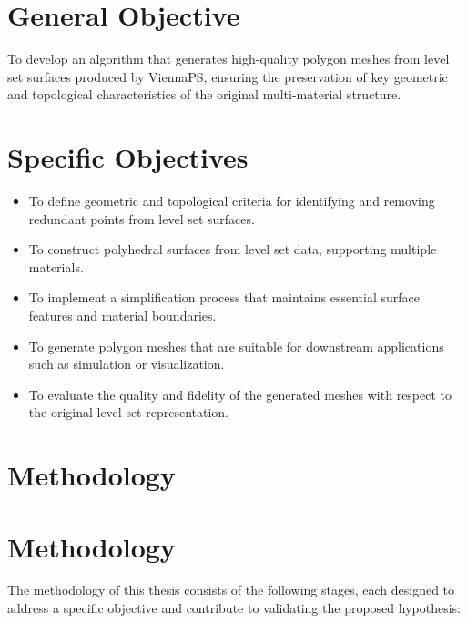 \documentclass[submission]{eptcs}
\begin{document}
\section{General Objective}

To develop an algorithm that generates high-quality polygon meshes from level set surfaces produced by ViennaPS, ensuring the preservation of key geometric and topological characteristics of the original multi-material structure.



\section{Specific Objectives}

\begin{itemize}
    \item To define geometric and topological criteria for identifying and removing redundant points from level set surfaces.
    \item To construct polyhedral surfaces from level set data, supporting multiple materials.
    \item To implement a simplification process that maintains essential surface features and material boundaries.
    \item To generate polygon meshes that are suitable for downstream applications such as simulation or visualization.
    \item To evaluate the quality and fidelity of the generated meshes with respect to the original level set representation.
\end{itemize}

\section{Methodology}

\section{Methodology}

The methodology of this thesis consists of the following stages, each designed to address a specific objective and contribute to validating the proposed hypothesis:
\end{document}
